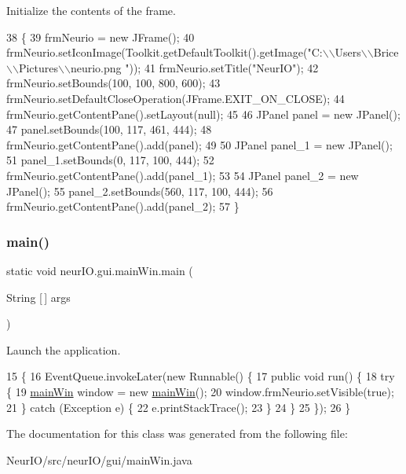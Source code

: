 Initialize the contents of the frame. 
\begin{DoxyCode}
38                               \{
39         frmNeurio = \textcolor{keyword}{new} JFrame();
40         frmNeurio.setIconImage(Toolkit.getDefaultToolkit().getImage(\textcolor{stringliteral}{"C:\(\backslash\)\(\backslash\)Users\(\backslash\)\(\backslash\)Brice\(\backslash\)\(\backslash\)Pictures\(\backslash\)\(\backslash\)neurio.png
      "}));
41         frmNeurio.setTitle(\textcolor{stringliteral}{"NeurIO"});
42         frmNeurio.setBounds(100, 100, 800, 600);
43         frmNeurio.setDefaultCloseOperation(JFrame.EXIT\_ON\_CLOSE);
44         frmNeurio.getContentPane().setLayout(null);
45         
46         JPanel panel = \textcolor{keyword}{new} JPanel();
47         panel.setBounds(100, 117, 461, 444);
48         frmNeurio.getContentPane().add(panel);
49         
50         JPanel panel\_1 = \textcolor{keyword}{new} JPanel();
51         panel\_1.setBounds(0, 117, 100, 444);
52         frmNeurio.getContentPane().add(panel\_1);
53         
54         JPanel panel\_2 = \textcolor{keyword}{new} JPanel();
55         panel\_2.setBounds(560, 117, 100, 444);
56         frmNeurio.getContentPane().add(panel\_2);
57     \}
\end{DoxyCode}
\mbox{\label{classneur_i_o_1_1gui_1_1main_win_a83d7ab4e35ec91fe149719b2c25cf834}} 
\subsubsection{\texorpdfstring{main()}{main()}}
{\footnotesize\ttfamily static void neur\+I\+O.\+gui.\+main\+Win.\+main (\begin{DoxyParamCaption}\item[{String \mbox{[}$\,$\mbox{]}}]{args }\end{DoxyParamCaption})\hspace{0.3cm}{\ttfamily [static]}}

Launch the application. 
\begin{DoxyCode}
15                                            \{
16         EventQueue.invokeLater(\textcolor{keyword}{new} Runnable() \{
17             \textcolor{keyword}{public} \textcolor{keywordtype}{void} run() \{
18                 \textcolor{keywordflow}{try} \{
19                     \hyperlink{classmain_win}{mainWin} window = \textcolor{keyword}{new} \hyperlink{classneur_i_o_1_1gui_1_1main_win_afea0b56eba10143502905975ceba7e25}{mainWin}();
20                     window.frmNeurio.setVisible(\textcolor{keyword}{true});
21                 \} \textcolor{keywordflow}{catch} (Exception e) \{
22                     e.printStackTrace();
23                 \}
24             \}
25         \});
26     \}
\end{DoxyCode}


The documentation for this class was generated from the following file\+:\begin{DoxyCompactItemize}
\item 
Neur\+I\+O/src/neur\+I\+O/gui/main\+Win.\+java\end{DoxyCompactItemize}
